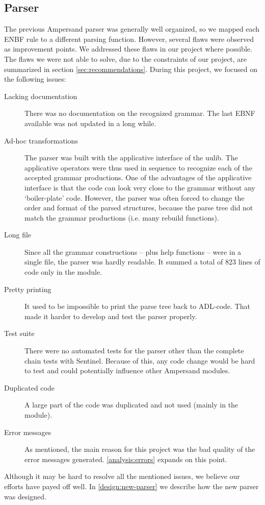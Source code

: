 
\subsection{Parser}
\label{analysis:parser}
The previous Ampersand parser was generally well organized, so we mapped each ENBF rule to a different parsing function.
However, several flaws were observed as improvement points.
We addressed these flaws in our project where possible.
The flaws we were not able to solve, due to the constraints of our project, are summarized in section \autoref{sec:recommendations}.
During this project, we focused on the following issues:
\begin{description}
  \item[Lacking documentation]
    There was no documentation on the recognized grammar.
    The last EBNF available was not updated in a long while.
  
  \item[Ad-hoc transformations]
    The parser was built with the applicative interface of the uulib.
    The applicative operators were thus used in sequence to recognize each of the accepted grammar productions.
    One of the advantages of the applicative interface is that the code can look very close to the grammar without any `boiler-plate' code.
    However, the parser was often forced to change the order and format of the parsed structures, because the parse tree did not match the grammar productions (i.e. many rebuild functions).
    
  \item[Long file]
    Since all the grammar constructions -- plus help functions -- were in a single file, the parser was hardly readable.
    It summed a total of 823 lines of code only in the  module.
  
  \item[Pretty printing]
    It used to be impossible to print the parse tree back to ADL-code.
    That made it harder to develop and test the parser properly.
  
  \item[Test suite]
    There were no automated tests for the parser other than the complete chain tests with Sentinel.
    Because of this, any code change would be hard to test and could potentially influence other Ampersand modules.
  
  \item[Duplicated code]
    A large part of the code was duplicated and not used (mainly in the  module).
  
  \item[Error messages]
    As mentioned, the main reason for this project was the bad quality of the error messages generated.
    \autoref{analysis:errors} expands on this point.
\end{description}
%
Although it may be hard to resolve all the mentioned issues, we believe our efforts have payed off well.
In \autoref{design:new-parser} we describe how the new parser was designed.
